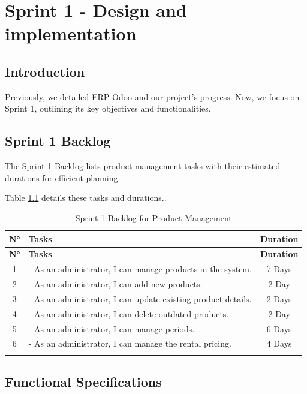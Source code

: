 \chapter{Sprint 1 - Design and implementation}

\section*{Introduction}
Previously, we detailed ERP Odoo and our project's progress. Now, we focus on Sprint 1, outlining its key objectives and functionalities.


\section{Sprint 1 Backlog}
The Sprint 1 Backlog lists product management tasks with their estimated durations for efficient planning.

Table \ref{tab:sprint1_product_management} details these tasks and durations..


\begin{longtable}{|c|p{8cm}|c|}
    \hline
    \rowcolor{purple!20} \textbf{N°} & \textbf{Tasks} & \textbf{Duration} \\ \hline
    \endfirsthead
    \hline
    \rowcolor{purple!20} \textbf{N°} & \textbf{Tasks} & \textbf{Duration} \\ \hline
    \endhead
    1 & - As an administrator, I can manage products in the system. & 7 Days \\ \hline
    2 & - As an administrator, I can add new products. & 2 Day \\ \hline
    3 & - As an administrator, I can update existing product details. & 2 Days \\ \hline
    4 & - As an administrator, I can delete outdated products. & 2 Day \\ \hline
    5 & - As an administrator, I can manage periods. & 6 Days \\ \hline
    6 & - As an administrator, I can manage the rental pricing. & 4 Days \\ \hline
    \caption{Sprint 1 Backlog for Product Management}
    \label{tab:sprint1_product_management}
\end{longtable}

\section{Functional Specifications}

